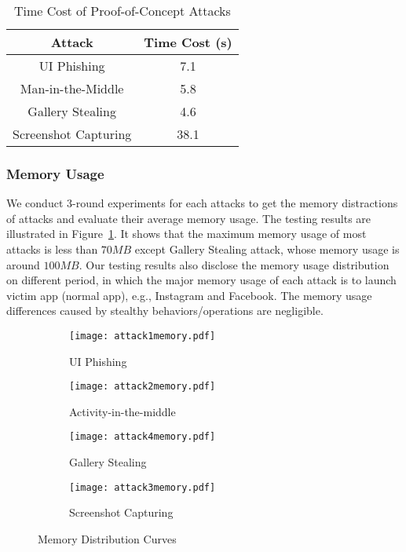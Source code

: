 \begin{table}[h]
  \centering
\caption{Time Cost of Proof-of-Concept Attacks}
\label{tbl:time}
\begin{footnotesize}
\begin{tabular}{|c|c|}
  \hline
  \textbf{Attack} & \textbf{Time Cost (s)} \\
  \hline\hline
  UI Phishing & 7.1\\
  \hline
  Man-in-the-Middle & 5.8\\
  \hline
  Gallery Stealing & 4.6 \\
  \hline
  Screenshot Capturing & 38.1\\
  \hline
\end{tabular}
\end{footnotesize}
\end{table}

\subsubsection{Memory Usage}

We conduct 3-round experiments for each attacks to get the memory
distractions of attacks and evaluate their average memory usage. The
testing results are illustrated in Figure~\ref{fig:memory}.  It shows
that the maximum memory usage of most attacks is less than $70MB$ except
Gallery Stealing attack, whose memory usage is around $100MB$. Our
testing results also disclose the memory usage distribution on
different period, in which the major memory usage of each attack is to
launch victim app (normal app), e.g., Instagram and Facebook. The
memory usage differences caused by stealthy behaviors/operations are
negligible.

\begin{figure}[h]
        \centering
        \begin{subfigure}[t]{0.25\textwidth}
                \centering
               \texttt{[image: attack1memory.pdf]}
                \caption{UI Phishing}
        \end{subfigure}%
        \begin{subfigure}[t]{0.25\textwidth}
                \centering
          \texttt{[image: attack2memory.pdf]}
                \caption{Activity-in-the-middle}
        \end{subfigure}
        \begin{subfigure}[t]{0.25\textwidth}
                \centering
          \texttt{[image: attack4memory.pdf]}
                \caption{Gallery Stealing}
        \end{subfigure}%
        \begin{subfigure}[t]{0.25\textwidth}
                \centering
          \texttt{[image: attack3memory.pdf]}
                \caption{Screenshot Capturing}
        \end{subfigure}
         \caption{Memory Distribution Curves}
         \label{fig:memory}
\end{figure}

